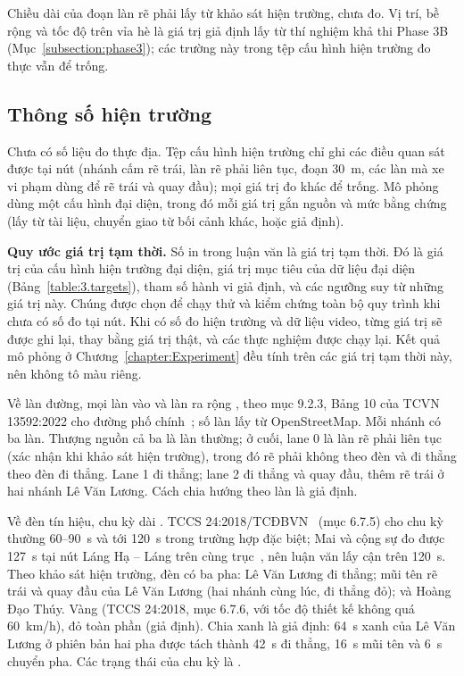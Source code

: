 \documentclass[../main.tex]{subfiles}
\begin{document}
Chiều dài  của đoạn làn rẽ phải lấy từ khảo sát hiện trường, chưa đo. Vị trí, bề rộng và tốc độ trên vỉa hè là giá trị giả định lấy từ thí nghiệm khả thi Phase 3B (Mục~\ref{subsection:phase3}); các trường này trong tệp cấu hình hiện trường đo thực vẫn để trống.

\subsection{Thông số hiện trường}

Chưa có số liệu đo thực địa. Tệp cấu hình hiện trường chỉ ghi các điều quan sát được tại nút (nhánh cấm rẽ trái, làn rẽ phải liên tục, đoạn 30~m, các làn mà xe vi phạm dùng để rẽ trái và quay đầu); mọi giá trị đo khác để trống. Mô phỏng dùng một cấu hình đại diện, trong đó mỗi giá trị gắn nguồn và mức bằng chứng (lấy từ tài liệu, chuyển giao từ bối cảnh khác, hoặc giả định).

\textbf{Quy ước giá trị tạm thời.} Số in  trong luận văn là giá trị tạm thời. Đó là giá trị của cấu hình hiện trường đại diện, giá trị mục tiêu của dữ liệu đại diện (Bảng~\ref{table:3.targets}), tham số hành vi giả định, và các ngưỡng suy từ những giá trị này. Chúng được chọn để chạy thử và kiểm chứng toàn bộ quy trình khi chưa có số đo tại nút. Khi có số đo hiện trường và dữ liệu video, từng giá trị sẽ được ghi lại, thay bằng giá trị thật, và các thực nghiệm được chạy lại. Kết quả mô phỏng ở Chương~\ref{chapter:Experiment} đều tính trên các giá trị tạm thời này, nên không tô màu riêng.

Về làn đường, mọi làn vào và làn ra rộng , theo mục 9.2.3, Bảng 10 của TCVN 13592:2022 cho đường phố chính~\cite{tcvn13592}; số làn lấy từ OpenStreetMap. Mỗi nhánh có ba làn. Thượng nguồn cả ba là làn thường; ở  cuối, lane 0 là làn rẽ phải liên tục (xác nhận khi khảo sát hiện trường), trong đó rẽ phải không theo đèn và đi thẳng theo đèn đi thẳng. Lane 1 đi thẳng; lane 2 đi thẳng và quay đầu, thêm rẽ trái ở hai nhánh Lê Văn Lương. Cách chia hướng theo làn là giả định.

Về đèn tín hiệu, chu kỳ dài . TCCS 24:2018/TCĐBVN~\cite{tccs24_2018} (mục 6.7.5) cho chu kỳ thường 60--90~s và tới 120~s trong trường hợp đặc biệt; Mai và cộng sự đo được 127~s tại nút Láng Hạ -- Láng trên cùng trục~\cite{mai2019signal}, nên luận văn lấy cận trên 120~s. Theo khảo sát hiện trường, đèn có ba pha: Lê Văn Lương đi thẳng; mũi tên rẽ trái và quay đầu của Lê Văn Lương (hai nhánh cùng lúc, đi thẳng đỏ); và Hoàng Đạo Thúy. Vàng  (TCCS 24:2018, mục 6.7.6, với tốc độ thiết kế không quá 60~km/h), đỏ toàn phần  (giả định). Chia xanh  là giả định: 64~s xanh của Lê Văn Lương ở phiên bản hai pha được tách thành 42~s đi thẳng, 16~s mũi tên và 6~s chuyển pha. Các trạng thái của chu kỳ là .
\end{document}
